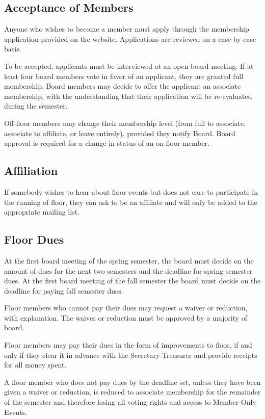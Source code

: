 	\subsection{Acceptance of Members}

	Anyone who wishes to become a member must apply through the membership application provided on the website. Applications are reviewed on a case-by-case basis. 
	
	To be accepted, applicants must be interviewed at an open board meeting. If at least four board members vote in favor of an applicant, they are granted full membership. Board members may decide to offer the applicant an associate membership, with the understanding that their application will be re-evaluated during the semester.

Off-floor members may change their membership level (from full to associate, associate to affiliate, or leave entirely), provided they notify Board. Board approval is required for a change in status of an on-floor member.



	\subsection{Affiliation}

	If somebody wishes to hear about floor events but does not care to participate in the running of floor, they can ask to be an affiliate and will only be added to the appropriate mailing list.



	\subsection{Floor Dues}

	At the first board meeting of the spring semester, the board must decide on the amount of dues for the next two semesters and the deadline for spring semester dues. At the first board meeting of the fall semester the board must decide on the deadline for paying fall semester dues.

	Floor members who cannot pay their dues may request a waiver or reduction, with explanation. The waiver or reduction must be approved by a majority of board. 
	
	Floor members may pay their dues in the form of improvements to floor, if and only if they clear it in advance with the Secretary-Treasurer and provide receipts for all money spent.

	A floor member who does not pay dues by the deadline set, unless they have been given a waiver or reduction, is reduced to associate membership for the remainder of the semester and therefore losing all voting rights and access to Member-Only Events.
